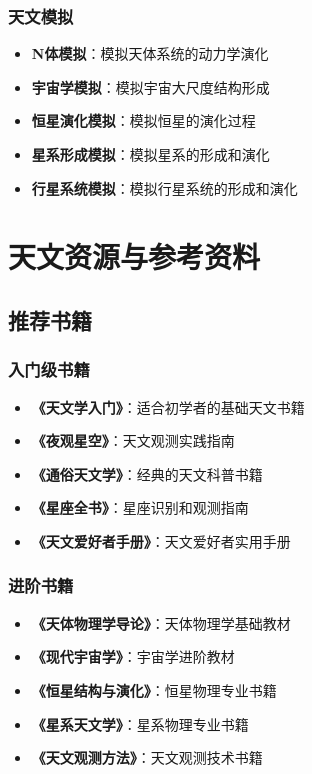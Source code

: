 \documentclass[12pt,UTF8]{ctexbook}
\begin{document}
\section{天文模拟}

\begin{itemize}
  \item \textbf{N体模拟}：模拟天体系统的动力学演化
  \item \textbf{宇宙学模拟}：模拟宇宙大尺度结构形成
  \item \textbf{恒星演化模拟}：模拟恒星的演化过程
  \item \textbf{星系形成模拟}：模拟星系的形成和演化
  \item \textbf{行星系统模拟}：模拟行星系统的形成和演化
\end{itemize}

\part{天文资源与参考资料}

\chapter{推荐书籍}
\section{入门级书籍}

\begin{itemize}
  \item \textbf{《天文学入门》}：适合初学者的基础天文书籍
  \item \textbf{《夜观星空》}：天文观测实践指南
  \item \textbf{《通俗天文学》}：经典的天文科普书籍
  \item \textbf{《星座全书》}：星座识别和观测指南
  \item \textbf{《天文爱好者手册》}：天文爱好者实用手册
\end{itemize}

\section{进阶书籍}

\begin{itemize}
  \item \textbf{《天体物理学导论》}：天体物理学基础教材
  \item \textbf{《现代宇宙学》}：宇宙学进阶教材
  \item \textbf{《恒星结构与演化》}：恒星物理专业书籍
  \item \textbf{《星系天文学》}：星系物理专业书籍
  \item \textbf{《天文观测方法》}：天文观测技术书籍
\end{itemize}
\end{document}
